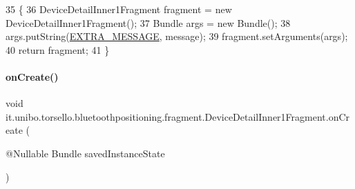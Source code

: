 \begin{DoxyCode}
35                                                                          \{
36         DeviceDetailInner1Fragment fragment = \textcolor{keyword}{new} DeviceDetailInner1Fragment();
37         Bundle args = \textcolor{keyword}{new} Bundle();
38         args.putString(\hyperlink{classit_1_1unibo_1_1torsello_1_1bluetoothpositioning_1_1fragment_1_1DeviceDetailInner1Fragment_ac0b0104608454a0d84a47ad82ef186fc_ac0b0104608454a0d84a47ad82ef186fc}{EXTRA\_MESSAGE}, message);
39         fragment.setArguments(args);
40         \textcolor{keywordflow}{return} fragment;
41     \}
\end{DoxyCode}
\hypertarget{classit_1_1unibo_1_1torsello_1_1bluetoothpositioning_1_1fragment_1_1DeviceDetailInner1Fragment_aaa8488de9fd9d2664615301e0f0d15b7_aaa8488de9fd9d2664615301e0f0d15b7}{}\label{classit_1_1unibo_1_1torsello_1_1bluetoothpositioning_1_1fragment_1_1DeviceDetailInner1Fragment_aaa8488de9fd9d2664615301e0f0d15b7_aaa8488de9fd9d2664615301e0f0d15b7} 
\paragraph{\texorpdfstring{on\+Create()}{onCreate()}}
{\footnotesize\ttfamily void it.\+unibo.\+torsello.\+bluetoothpositioning.\+fragment.\+Device\+Detail\+Inner1\+Fragment.\+on\+Create (\begin{DoxyParamCaption}\item[{@Nullable Bundle}]{saved\+Instance\+State }\end{DoxyParamCaption})}


